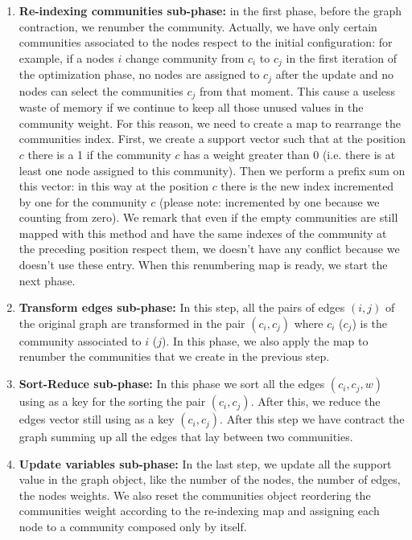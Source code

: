 \begin{enumerate}
	\item \textbf{Re-indexing communities sub-phase:}\label{Re-indexing} in the first phase, before the graph contraction, we renumber the community. Actually, we have only certain communities associated to the nodes respect to the initial configuration: for example, if a nodes $i$ change community from $c_i$ to $c_j$ in the first iteration of the optimization phase, no nodes are assigned to $c_j$ after the update and no nodes can select the communities $c_j$ from that moment. This cause a useless waste of memory if we continue to keep all those unused values in the community weight. For this reason, we need to create a map to rearrange the communities index.
	First, we create a support vector such that at the position $c$ there is a 1 if the community $c$ has a weight greater than 0 (i.e. there is at least one node assigned to this community). Then we perform a prefix sum on this vector: in this way at the position $c$ there is the new index incremented by one for the community $c$ (please note: incremented by one because we counting from zero).
	 We remark that even if the empty communities are still mapped with this method and have the same indexes of the community at the preceding position respect them, we doesn't have any conflict because we doesn't use these entry.
	 When this renumbering map is ready, we start the next phase.
	\item \textbf{Transform edges sub-phase:} In this step, all the pairs of edges $(i, j)$ of the original graph are transformed in the pair $(c_i, c_j)$ where $c_i$ ($c_j$) is the community associated to $i$ ($j$). In this phase, we also apply the map to renumber the communities that we create in the previous step. 
	\item \textbf{Sort-Reduce sub-phase:} In this phase we sort all the edges $(c_i, c_j, w)$ using as a key for the sorting the pair $(c_i, c_j)$. After this, we reduce the edges vector still using as a key $(c_i, c_j)$. After this step we have contract the graph summing up all the edges that lay between two communities.
	\item \textbf{Update variables sub-phase:}\label{updategraph}  In the last step, we update all the support value in the graph object, like the number of the nodes, the number of edges, the nodes weights. We also reset the communities object reordering the communities weight according to the re-indexing map and assigning each node to a community composed only by itself.
\end{enumerate}
